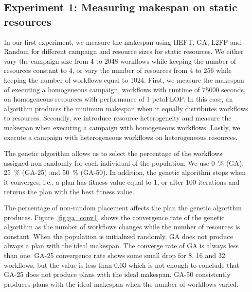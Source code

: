 \subsection{Experiment 1: Measuring makespan on static resources}

In our first experiment, we measure the makespan using HEFT, GA, L2FF and Random for different campaign and resource sizes for static resources.
We either vary the campaign size from 4 to 2048 workflows while keeping the number of resources constant to 4, or vary the number of resources from 4 to 256 while keeping the number of workflows equal to 1024.
First, we measure the makespan of executing a homogeneous campaign, workflows with runtime of 75000 seconds,  on homogeneous resources with performance of 1 petaFLOP.
In this case, an algorithm produces the minimum makespan when it equally distributes workflows to resources.
Secondly, we introduce resource heterogeneity and measure the makespan when executing a campaign with homogeneous workflows.
Lastly, we execute a campaign with heterogeneous workflows on heterogeneous resources.

The genetic algorithm allows us to select the percentage of the workflows assigned non-randomly for each individual of the population.
We use 0~\% (GA), 25~\% (GA-25) and 50~\% (GA-50).
In addition, the genetic algorithm stops when it converges, i.e., a plan has fitness value equal to 1, or after 100 iterations and returns the plan with the best fitness value.

The percentage of non-random placement affects the plan the genetic algorithm produces.
Figure~\ref{fig:ga_conv1} shows the convergence rate of the genetic algorithm as the number of workflows changes while the number of resources is constant.
When the population is initialized randomly, GA does not produce always a plan with the ideal makespan.
The converge rate of GA is always less than one.
GA-25 convergence rate shows some small drop for 8, 16 and 32 workflows, but the value is less than 0.03 which is not enough to conclude that GA-25 does not produce plans with the ideal makespan.
GA-50 consistently produces plans with the ideal makespan when the number of workflows varied.

